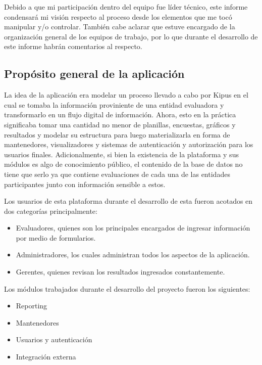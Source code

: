 Debido a que mi participación dentro del equipo fue líder técnico, este informe condensará mi visión respecto al proceso desde los elementos que me tocó manipular y/o controlar. También cabe aclarar que estuve encargado de la organización general de los equipos de trabajo, por lo que durante el desarrollo de este informe habrán comentarios al respecto.

\subsection{Propósito general de la aplicación}
La idea de la aplicación era modelar un proceso llevado a cabo por Kipus en el cual se tomaba la información proviniente de una entidad evaluadora y transformarlo en un flujo digital de información. Ahora, esto en la práctica significaba tomar una cantidad no menor de planillas, encuestas, gráficos y resultados y modelar su estructura para luego materializarla en forma de mantenedores, visualizadores y sistemas de autenticación y autorización para los usuarios finales. Adicionalmente, si bien la existencia de la plataforma y sus módulos es algo de conocimiento público, el contenido de la base de datos no tiene que serlo ya que contiene evaluaciones de cada una de las entidades participantes junto con información sensible a estos.

Los usuarios de esta plataforma durante el desarrollo de esta fueron acotados en dos categorías principalmente:

\begin{itemize}
    \item Evaluadores, quienes son los principales encargados de ingresar información por medio de formularios.
    \item Administradores, los cuales administran todos los aspectos de la aplicación.
    \item Gerentes, quienes revisan los resultados ingresados constantemente.
\end{itemize}

Los módulos trabajados durante el desarrollo del proyecto fueron los siguientes:

\begin{itemize}
    \item Reporting
    \item Mantenedores
    \item Usuarios y autenticación
    \item Integración externa
\end{itemize}

